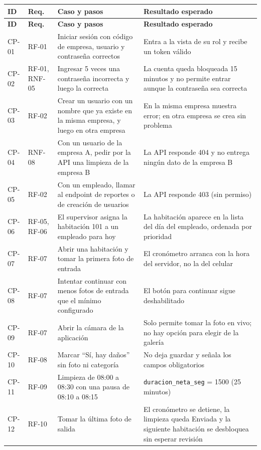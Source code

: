 \documentclass[11pt,a4paper]{article}
\begin{document}
{\small
\setlength{\tabcolsep}{4pt}
\begin{longtable}{L{1.1cm} L{1.5cm} L{6.3cm} L{5.6cm}}
\toprule
\textbf{ID} & \textbf{Req.} & \textbf{Caso y pasos} & \textbf{Resultado esperado}\\
\midrule
\endfirsthead
\toprule
\textbf{ID} & \textbf{Req.} & \textbf{Caso y pasos} & \textbf{Resultado esperado}\\
\midrule
\endhead
\bottomrule
\endfoot
CP-01 & RF-01 & Iniciar sesión con código de empresa, usuario y contraseña correctos & Entra a la vista de su rol y recibe un token válido\\
CP-02 & RF-01, RNF-05 & Ingresar 5 veces una contraseña incorrecta y luego la correcta & La cuenta queda bloqueada 15 minutos y no permite entrar aunque la contraseña sea correcta\\
CP-03 & RF-02 & Crear un usuario con un nombre que ya existe en la misma empresa, y luego en otra empresa & En la misma empresa muestra error; en otra empresa se crea sin problema\\
CP-04 & RNF-08 & Con un usuario de la empresa A, pedir por la API una limpieza de la empresa B & La API responde 404 y no entrega ningún dato de la empresa B\\
CP-05 & RF-02 & Con un empleado, llamar al endpoint de reportes o de creación de usuarios & La API responde 403 (sin permiso)\\
CP-06 & RF-05, RF-06 & El supervisor asigna la habitación 101 a un empleado para hoy & La habitación aparece en la lista del día del empleado, ordenada por prioridad\\
CP-07 & RF-07 & Abrir una habitación y tomar la primera foto de entrada & El cronómetro arranca con la hora del servidor, no la del celular\\
CP-08 & RF-07 & Intentar continuar con menos fotos de entrada que el mínimo configurado & El botón para continuar sigue deshabilitado\\
CP-09 & RF-07 & Abrir la cámara de la aplicación & Solo permite tomar la foto en vivo; no hay opción para elegir de la galería\\
CP-10 & RF-08 & Marcar \enquote{Sí, hay daños} sin foto ni categoría & No deja guardar y señala los campos obligatorios\\
CP-11 & RF-09 & Limpieza de 08:00 a 08:30 con una pausa de 08:10 a 08:15 & \texttt{duracion\_neta\_seg} = 1500 (25 minutos)\\
CP-12 & RF-10 & Tomar la última foto de salida & El cronómetro se detiene, la limpieza queda Enviada y la siguiente habitación se desbloquea sin esperar revisión\\

\end{longtable}}
\end{document}
